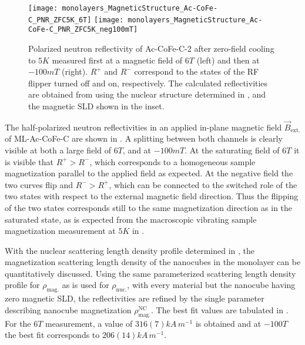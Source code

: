 \documentclass[\main/dresen_thesis.tex]{subfiles}
\begin{document}
  \begin{figure}[tb]
    \centering
    \texttt{[image: monolayers\_MagneticStructure\_Ac-CoFe-C\_PNR\_ZFC5K\_6T]}
    \texttt{[image: monolayers\_MagneticStructure\_Ac-CoFe-C\_PNR\_ZFC5K\_neg100mT]}
    \caption{\label{fig:monolayer:magneticStructure:pnr5K}Polarized neutron reflectivity of Ac-CoFe-C-2 after zero-field cooling to $5 \unit{K}$ measured first at a magnetic field of $6 \unit{T}$ (left) and then at $-100 \unit{mT}$ (right). $R^{+}$ and $R^{-}$ correspond to the states of the RF flipper turned off and on, respectively. The calculated reflectivities are obtained from using the nuclear structure determined in , and the magnetic SLD shown in the inset.}
  \end{figure}
  The half-polarized neutron reflectivities in an applied in-plane magnetic field $\vec{B}_\mathrm{ext.}$ of ML-Ac-CoFe-C are shown in .
  A splitting between both channels is clearly visible at both a large field of $6 \unit{T}$, and at $-100 \unit{mT}$.
  At the saturating field of $6 \unit{T}$ it is visible that $R^{+} > R^{-}$, which corresponds to a homogeneous sample magnetization parallel to the applied field as expected.
  At the negative field the two curves flip and $R^{-} > R^{+}$, which can be connected to the switched role of the two states with respect to the external magnetic field direction.
  Thus the flipping of the two states corresponds still to the same magnetization direction as in the saturated state, as is expected from the macroscopic vibrating sample magnetization measurement at $5 \unit{K}$ in .

  With the nuclear scattering length density profile determined in , the magnetization scattering length density of the nanocubes in the monolayer can be quantitatively discussed.
  Using the same parameterized scattering length density profile for $\rho_\mathrm{mag.}$ as is used for $\rho_\mathrm{nuc.}$, with every material but the nanocube having zero magnetic SLD, the reflectivities are refined by the single parameter describing nanocube magnetization $\rho_\mathrm{mag.}^\mathrm{NC}$.
  The best fit values are tabulated in .
  For the $6 \unit{T}$ measurement, a value of $316(7) \unit{kA \, m^{-1}}$ is obtained and at $-100 \unit{T}$ the best fit corresponds to $206(14) \unit{kA \, m^{-1}}$.
\end{document}
